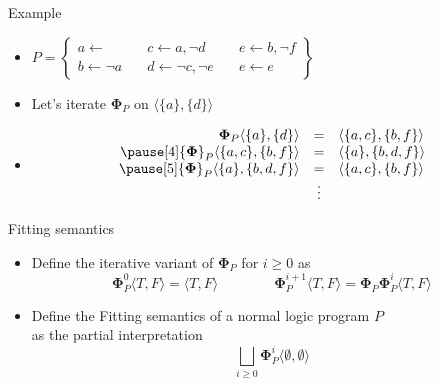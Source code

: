 \begin{frame}{Example}
  \bigskip
  \begin{itemize}
  \item<1->
    \(
    P
    =
    \left\{
      \begin{array}{lll}
        a \leftarrow                \quad &
        c \leftarrow a, \neg d      \quad &
        e \leftarrow b, \neg f
        \\
        b \leftarrow \neg a         \quad &
        d \leftarrow \neg c, \neg e \quad &
        e \leftarrow e
      \end{array}
    \right\}
    \)
    \bigskip
  \item<2-> Let's iterate ${\mathbf{\Phi}}_{P}$ on $\langle \{a\}, \{d\}\rangle$
  \item<3-> []
    \[
    \begin{array}{rcl}
    {\mathbf{\Phi}}_{P}\langle\{a  \},\{  d  \}\rangle &=&\langle\{a,c\},\{b,f  \}\rangle
    \\\pause[4]
    {\mathbf{\Phi}}_{P}\langle\{a,c\},\{b,  f\}\rangle &=&\langle\{a  \},\{b,d,f\}\rangle
    \\\pause[5]
    {\mathbf{\Phi}}_{P}\langle\{a  \},\{b,d,f\}\rangle &=&\langle\{a,c\},\{b,f  \}\rangle
    \\
    & \vdots &
    \end{array}
    \]
  \end{itemize}
\end{frame}
\begin{frame}{Fitting semantics}
  \bigskip
  \begin{itemize}
  \item<2-> Define the iterative variant of ${\mathbf{\Phi}}_P$ for $i\geq 0$ as
    \[
      {\mathbf{\Phi}}_P^0\langle T, F \rangle = \langle T, F \rangle
      \qquad\qquad
      {\mathbf{\Phi}}_P^{i+1}\langle T, F \rangle =
      {\mathbf{\Phi}}_P{\mathbf{\Phi}}_P^i\langle T, F \rangle
    \]
  \item<3-> Define the \alert{Fitting semantics} of a normal logic program $P$\\
    as the partial interpretation
    \[
      \textstyle{\bigsqcup_{i \geq 0}} {\mathbf{\Phi}}_P^i \langle \emptyset, \emptyset \rangle
    \]
  \end{itemize}
\nocite{fitting85a}
\end{frame}
